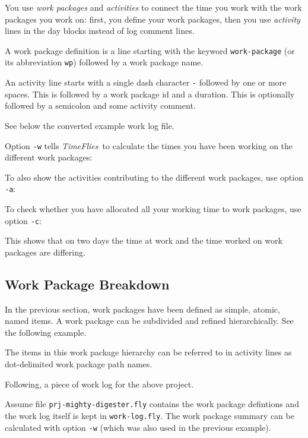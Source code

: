 \documentclass[11pt]{article}
\newcommand{\timeflies}{\emph{TimeFlies}}
\begin{document}
You use \emph{work packages} and \emph{activities} to connect the time you work with the work packages you work on: first, you define your work packages, then you use \emph{activity} lines in the day blocks instead of log comment lines.

A work package definition is a line starting with the keyword \verb:work-package: (or its abbreviation \verb:wp:) followed by a work package name.

An activity line starts with a single dash character \verb:-: followed by one or more spaces. This is followed by a work package id and a duration. This is optionally followed by a semicolon and some activity comment.

See below the converted example work log file.



Option \verb:-w: tells \timeflies\ to calculate the times you have been working on the different work packages:



To also show the activities contributing to the different work packages, use option \verb:-a::



To check whether you have allocated all your working time to work packages, use option \verb:-c::



This shows that on two days the time at work and the time worked on work packages are differing.

\subsection{Work Package Breakdown}

In the previous section, work packages have been defined as simple, atomic, named items. A work package can be subdivided and refined hierarchically. See the following example.



The items in this work package hierarchy can be referred to in activity lines as dot-delimited work package path names.

Following, a piece of work log for the above project.



Assume file \verb:prj-mighty-digester.fly: contains the work package defintions and the work log itself is kept in \verb:work-log.fly:. The work package summary can be calculated with option \verb:-w: (which was also used in the previous example).
\end{document}
